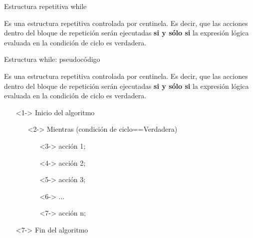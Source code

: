 \documentclass[xcolor=pdftex,table,11pt]{beamer}
\begin{document}
\begin{frame}{Estructura repetitiva while}
\begin{block}{}
 Es una estructura repetitiva controlada por centinela. Es decir, que las acciones dentro del bloque de repetición serán ejecutadas \textbf{si y sólo si} la expresión lógica evaluada en la condición de ciclo es verdadera. 
\end{block}
\end{frame}

\begin{frame}{Estructura while: pseudocódigo}

 \begin{block}{}
 Es una estructura repetitiva controlada por centinela. Es decir, que las acciones dentro del bloque de repetición serán ejecutadas \textbf{si y sólo si} la expresión lógica evaluada en la condición de ciclo es verdadera. 
\end{block}
\begin{itemize}
   \item[]<1-> Inicio del algoritmo

   \begin{itemize}
   		\item[]<2-> Mientras (condición de ciclo==Verdadera)
     	\begin{itemize}
     			\item[]<3->  acción 1;
     			\item[]<4->  acción 2;
     			\item[]<5->  acción 3;
     			\item[]<6->  ...
     			\item[]<7->  acción n;
     	\end{itemize}
   \end{itemize}
  \item[]<7-> Fin del algoritmo 
  
  
\end{itemize}



\end{frame}
\end{document}
